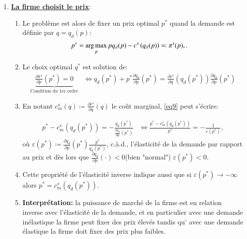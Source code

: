 \documentclass[notes, ignorenonframetext, compress, 9pt, xcolor=svgnames, aspectratio=169]{beamer}
\begin{document}
\begin{frame}
\begin{itemize}
\begin{enumerate}
  \item \textbf{\underline{La firme choisit le prix}}:
  \begin{enumerate}[$\cdot$]
  \item Le problème est alors de fixer un prix optimal $p^*$ quand la demande est définie par $q = q_d(p)$:
  \begin{align}
  p^* &= \argmax_{p} pq_d(p)- c^s\left(q_d(p)\right) \eqqcolon \pi^s(p), \label{eq9}.
  \end{align}
   \item  Le choix optimal $q^*$ est solution de:
  \begin{align}
   \underbrace{\frac{\partial \pi^s}{\partial p}(p^*) = 0}_{\text{Condition du 1er ordre}}&\Leftrightarrow  q_d(p^*) + p^*\frac{\partial q_d}{\partial p}(p^*) = 
   \frac{\partial c^s}{\partial q}\left(q_d(p^*)\right)\frac{\partial q_d}{\partial p}(p^*)
   \label{eq9}
  \end{align}
  \item En notant $c^s_m(q)\coloneqq  \frac{\partial c^s}{\partial q}(q)$ le coût marginal, \eqref{eq9} peut s'écrire:
  
  \begin{align}
  p^* - c^s_m\left(q_d(p^*)\right) = -\frac{q_d(p^*)}{\frac{\partial q_d}{\partial p}(p^*)} &\Leftrightarrow \frac{p^* - c^s_m\left(q_d(p^*)\right)}{p^*} = -\frac{1}{\varepsilon(p^*)},
  \label{eq10}
  \end{align}
  où $\varepsilon(p^*) \coloneqq \frac{\partial q_d}{\partial p}(p^*)\frac{p^*}{q_d(p^*)}$, c.à.d., l'élasticité de la demande par rapport au prix et dès lors que $\frac{\partial q_d}{\partial p}(\cdot)<0$(bien "normal")  $\varepsilon(p^*)<0$.
  \item Cette propriété de l'élasticité inverse indique aussi que si $\varepsilon(p^*) \to -\infty$ alors $p^* =  c^s_m\left(q_d(p^*)\right)$.
  \item \textbf{Interprétation:} la puissance de marché de la firme est en relation inverse avec l'élasticité de la demande, et en particulier  avec une demande inélastique la firme peut fixer des prix élevés tandis qu' avec une demande élastique la firme doit fixer des prix plus faibles.
  \end{enumerate}
  \end{enumerate}
  \end{itemize}
  \end{frame}
\end{document}
